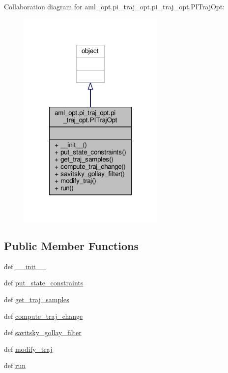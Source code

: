 Collaboration diagram for aml\-\_\-opt.\-pi\-\_\-traj\-\_\-opt.\-pi\-\_\-traj\-\_\-opt.\-P\-I\-Traj\-Opt\-:\nopagebreak
\begin{figure}[H]
\begin{center}
\leavevmode
\includegraphics[width=204pt]{classaml__opt_1_1pi__traj__opt_1_1pi__traj__opt_1_1_p_i_traj_opt__coll__graph}
\end{center}
\end{figure}
\subsection*{Public Member Functions}
\begin{DoxyCompactItemize}
\item 
def \hyperlink{classaml__opt_1_1pi__traj__opt_1_1pi__traj__opt_1_1_p_i_traj_opt_a0a71f80fcff8bdf8328ae0a532125e1d}{\-\_\-\-\_\-init\-\_\-\-\_\-}
\item 
def \hyperlink{classaml__opt_1_1pi__traj__opt_1_1pi__traj__opt_1_1_p_i_traj_opt_a4005747e098a9549c82f7c4905a071a7}{put\-\_\-state\-\_\-constraints}
\item 
def \hyperlink{classaml__opt_1_1pi__traj__opt_1_1pi__traj__opt_1_1_p_i_traj_opt_a9048ee7c5eefabd1b60cb9ae8a4110ed}{get\-\_\-traj\-\_\-samples}
\item 
def \hyperlink{classaml__opt_1_1pi__traj__opt_1_1pi__traj__opt_1_1_p_i_traj_opt_a29e2be5e4e1269619e32fc8526d9fe09}{compute\-\_\-traj\-\_\-change}
\item 
def \hyperlink{classaml__opt_1_1pi__traj__opt_1_1pi__traj__opt_1_1_p_i_traj_opt_adbdd2dacb2bf0a3abe79752034074d0c}{savitsky\-\_\-gollay\-\_\-filter}
\item 
def \hyperlink{classaml__opt_1_1pi__traj__opt_1_1pi__traj__opt_1_1_p_i_traj_opt_ab61b672735f26076de753af61ad0fd6c}{modify\-\_\-traj}
\item 
def \hyperlink{classaml__opt_1_1pi__traj__opt_1_1pi__traj__opt_1_1_p_i_traj_opt_a98370ec436863fadd75ccc95ed4eaa83}{run}
\end{DoxyCompactItemize}


